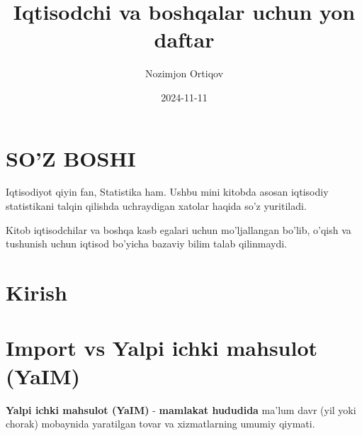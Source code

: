 \documentclass[
  letterpaper,
  DIV=11,
  numbers=noendperiod,
  oneside]{scrreprt}
\title{Iqtisodchi va boshqalar uchun yon daftar}
\author{Nozimjon Ortiqov}
\date{2024-11-11}
\renewcommand*\contentsname{Table of contents}
\newcommand\contentsname{Table of contents}
\begin{document}
\maketitle
\ifdefined\Shaded\renewenvironment{Shaded}{\begin{tcolorbox}[borderline west={3pt}{0pt}{shadecolor}, interior hidden, breakable, enhanced, frame hidden, sharp corners, boxrule=0pt]}{\end{tcolorbox}}\fi

\renewcommand*\contentsname{Table of contents}
{
\hypersetup{linkcolor=}
\setcounter{tocdepth}{2}
\tableofcontents
}

\hypertarget{soz-boshi}{%
\chapter*{SO'Z BOSHI}\label{soz-boshi}}


Iqtisodiyot qiyin fan, Statistika ham. Ushbu mini kitobda asosan
iqtisodiy statistikani talqin qilishda uchraydigan xatolar haqida so'z
yuritiladi.

Kitob iqtisodchilar va boshqa kasb egalari uchun mo'ljallangan bo'lib,
o'qish va tushunish uchun iqtisod bo'yicha bazaviy bilim talab
qilinmaydi.


\hypertarget{kirish}{%
\chapter*{Kirish}\label{kirish}}



\hypertarget{import-vs-yalpi-ichki-mahsulot-yaim}{%
\chapter*{Import vs Yalpi ichki mahsulot
(YaIM)}\label{import-vs-yalpi-ichki-mahsulot-yaim}}


\textbf{Yalpi ichki mahsulot (YaIM)} - \textbf{mamlakat hududida} ma'lum
davr (yil yoki chorak) mobaynida yaratilgan tovar va xizmatlarning
umumiy qiymati.
\end{document}
